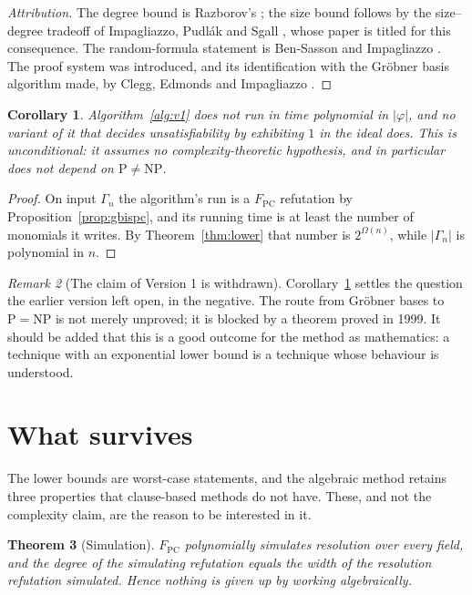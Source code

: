 \documentclass[11pt]{article}
\theoremstyle{plain}
\newtheorem{theorem}{Theorem}[section]
\newtheorem{corollary}[theorem]{Corollary}
\theoremstyle{definition}
\theoremstyle{remark}
\newtheorem{remark}[theorem]{Remark}
\newcommand{\PC}{F_{\mathrm{PC}}}
\begin{document}
\begin{proof}[Attribution]
The degree bound is Razborov's \cite{razborov}; the size bound follows by the
size--degree tradeoff of Impagliazzo, Pudl\'ak and Sgall \cite{ips}, whose
paper is titled for this consequence. The random-formula statement is
Ben-Sasson and Impagliazzo \cite{bsi}. The proof system was introduced, and its
identification with the Gr\"obner basis algorithm made, by Clegg, Edmonds and
Impagliazzo \cite{clegg}.
\end{proof}

\begin{corollary}\label{cor:nopoly}
Algorithm~\ref{alg:v1} does not run in time polynomial in $|\varphi|$, and no
variant of it that decides unsatisfiability by exhibiting $1$ in the ideal
does. This is unconditional: it assumes no complexity-theoretic hypothesis, and
in particular does not depend on $\mathrm{P}\ne\mathrm{NP}$.
\end{corollary}

\begin{proof}
On input $\Gamma_{n}$ the algorithm's run is a $\PC$ refutation by
Proposition~\ref{prop:gbispc}, and its running time is at least the number of
monomials it writes. By Theorem~\ref{thm:lower} that number is $2^{\Omega(n)}$,
while $|\Gamma_{n}|$ is polynomial in $n$.
\end{proof}

\begin{remark}[The claim of Version 1 is withdrawn]
Corollary~\ref{cor:nopoly} settles the question the earlier version left open,
in the negative. The route from Gr\"obner bases to $\mathrm{P}=\mathrm{NP}$ is
not merely unproved; it is blocked by a theorem proved in 1999. It should be
added that this is a good outcome for the method as mathematics: a technique
with an exponential lower bound is a technique whose behaviour is understood.
\end{remark}

\section{What survives}

The lower bounds are worst-case statements, and the algebraic method retains
three properties that clause-based methods do not have. These, and not the
complexity claim, are the reason to be interested in it.

\begin{theorem}[Simulation]\label{thm:sim}
$\PC$ polynomially simulates resolution over every field, and the degree of the
simulating refutation equals the width of the resolution refutation simulated.
Hence nothing is given up by working algebraically.
\end{theorem}
\end{document}
